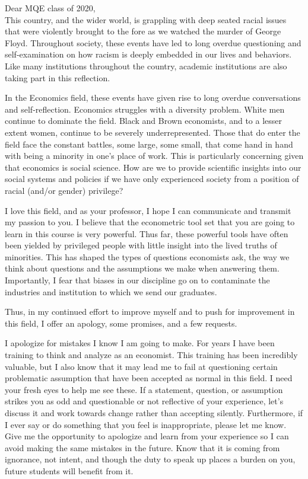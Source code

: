 \documentclass[a4paper, 10pt]{article}
\begin{document}
\vspace{10mm}
\linespread{1.25}
\bigskip
Dear MQE class of 2020,\\ 


This country, and the wider world, is grappling with deep seated racial issues that were violently brought to the fore as we watched the murder of George Floyd. Throughout society, these events have led to long overdue questioning and self-examination on how racism is deeply embedded in our lives and behaviors. Like many institutions throughout the country, academic institutions are also taking part in this reflection. 

In the Economics field, these events have given rise to long overdue conversations and self-reflection. Economics struggles with a diversity problem. White men continue to dominate the field. Black and Brown economists, and to a lesser extent women, continue to be severely underrepresented. Those that do enter the field face the constant battles, some large, some small, that come hand in hand with being a minority in one's place of work. This is particularly concerning given that economics is social science. How are we to provide scientific insights into our social systems and policies if we have only experienced society from a position of racial (and/or gender) privilege?

I love this field, and as your professor, I hope I can communicate and transmit my passion to you. I believe that the econometric tool set that you are going to learn in this course is very powerful. Thus far, these powerful tools have often been yielded by privileged people with little insight into the lived truths of minorities. This has shaped the types of questions economists ask, the way we think about questions and the assumptions we make when answering them. Importantly, I fear that biases in our discipline go on to contaminate the industries and institution to which we send our graduates. 

Thus, in my continued effort to improve myself and to push for improvement in this field, I offer an apology, some promises, and a few requests.  


I apologize for mistakes I know I am going to make. For years I have been training to think and analyze as an economist. This training has been incredibly valuable, but I also know that it may lead me to fail at questioning certain problematic assumption that have been accepted as normal in this field.  I need your fresh eyes to help me see these. If a statement, question, or assumption strikes you as odd and questionable or not reflective of your experience, let's discuss it and work towards change rather than accepting silently. Furthermore, if I ever say or do something that you feel is inappropriate, please let me know. Give me the opportunity to apologize and learn from your experience so I can avoid making the same mistakes in the future. Know that it is coming from ignorance, not intent, and though the duty to speak up places a burden on you, future students will benefit from it.
\end{document}
